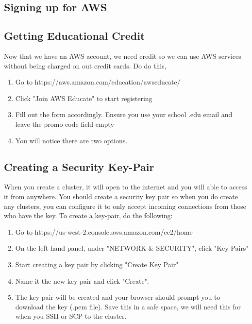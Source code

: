 \documentclass{article}
\begin{document}
\subsection{Signing up for AWS}
\subsection{Getting Educational Credit}
Now that we have an AWS account, we need credit so we can use AWS services without being charged on out credit cards. Do do this, 
\begin{enumerate}
    \item Go to https://aws.amazon.com/education/awseducate/
    \item Click "Join AWS Educate" to start registering
    \item Fill out the form accordingly. Ensure you use your school .edu email and leave the promo code field empty
    \item You will notice there are two options. 
    
\end{enumerate}

\subsection{Creating a Security Key-Pair}
When you create a cluster, it will open to the internet and you will able to access it from anywhere. You should create a security key pair so when you do create any clusters, you can configure it to only accept incoming connections from those who have the key. To create a key-pair, do the following:

\begin{enumerate}
    \item Go to https://us-west-2.console.aws.amazon.com/ec2/home
    \item On the left hand panel, under "NETWORK \& SECURITY", click "Key Pairs"
    \item Start creating a key pair by clicking "Create Key Pair"
    \item Name it the new key pair and click "Create".
    \item The key pair will be created and your browser should prompt you to download the key (.pem file). Save this in a safe space, we will need this for when you SSH or SCP to the cluster. 
\end{enumerate}


\end{document}
